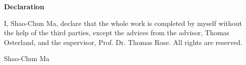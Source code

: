 \thispagestyle{plain}
\vspace*{\fill}
    \begin{center}
        \Large
        \textbf{Declaration}
    \end{center}

    \vspace{1cm}

    I, Shao-Chun Ma, declare that the whole work is completed by myself without the help of the third parties, except the advices from the advisor, Thomas Osterland, and the supervisor, Prof. Dr. Thomas Rose. All rights are reserved.

     Shao-Chun Ma
\vspace*{\fill}
